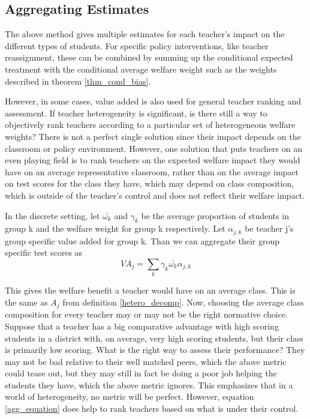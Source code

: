 \documentclass[12pt]{article}
\theoremstyle{definition}
\theoremstyle{definition}
\theoremstyle{definition}
\theoremstyle{definition}
\begin{document}

        \subsection{Aggregating Estimates}
        The above method gives multiple estimates for each teacher's impact on the different types of students. For specific policy interventions, like teacher reassignment, these can be combined by summing up the conditional expected treatment with the conditional average welfare weight such as the weights described in theorem \ref{thm_cond_bias}. 

        However, in some cases,  value added is also used for general teacher ranking and assessment. If teacher heterogeneity is significant, is there still a way to objectively rank teachers according to a particular set of heterogeneous welfare weights? There is not a perfect single solution since their impact depends on the classroom or policy environment. However, one solution that puts teachers on an even playing field is to rank teachers on the expected welfare impact they would have on an average representative classroom, rather than on the average impact on test scores for the class they have, which may depend on class composition, which is outside of the teacher's control and does not reflect their welfare impact.
        
        
        In the discrete setting, let $\bar{\omega_k}$ and $\gamma_k$ be the average proportion of students in group k and the welfare weight for group k respectively. Let $\alpha_{j,k}$ be teacher j's group specific value added for group k. Than we can aggregate their group specific test scores as 
        \begin{equation}
        \label{agg_equation}
            VA_j = \sum_k \gamma_k \bar{\omega_k} \alpha_{j,k}
        \end{equation}
        
        This gives the welfare benefit a teacher would have on an average class. This is the same as $A_j$ from definition \ref{hetero_decomp}. Now, choosing the average class composition for every teacher may or may not be the right normative choice. Suppose that a teacher has a big comparative advantage with high scoring students in a district with, on average, very high scoring students, but their class is primarily low scoring. What is the right way to assess their performance? They may not be bad relative to their well matched peers, which the above metric could tease out, but they may still in fact be doing a poor job helping the students they have, which the above metric ignores. This emphasizes that in a world of heterogeneity, no metric will be perfect. However, equation \ref{agg_equation} does help to rank teachers based on what is under their control. 
        
\end{document}
